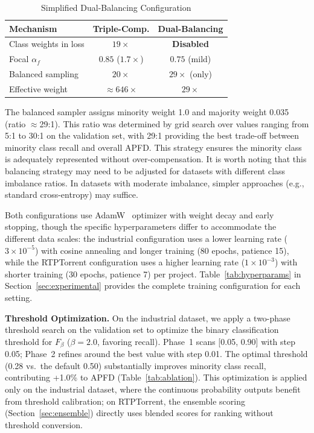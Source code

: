 \documentclass[10pt,journal,compsoc]{IEEEtran}
\begin{document}
\begin{table}[!t]
\centering
\caption{Simplified Dual-Balancing Configuration}
\label{tab:balancing}
\footnotesize
\begin{tabular}{lcc}
\toprule
\textbf{Mechanism} & \textbf{Triple-Comp.} & \textbf{Dual-Balancing} \\
\midrule
Class weights in loss & $19\times$ & \textbf{Disabled} \\
Focal $\alpha_f$ & $0.85$ ($1.7\times$) & $0.75$ (mild) \\
Balanced sampling & $20\times$ & $29\times$ (only) \\
\midrule
Effective weight & $\approx 646\times$ & $29\times$ \\
\bottomrule
\end{tabular}
\end{table}

The balanced sampler assigns minority weight 1.0 and majority weight 0.035
(ratio $\approx$29:1). This ratio was determined by grid search over values
ranging from 5:1 to 30:1 on the validation set, with 29:1 providing the best
trade-off between minority class recall and overall APFD. This strategy
ensures the minority class is adequately represented without over-compensation.
It is worth noting that this balancing strategy may need to be adjusted for
datasets with different class imbalance ratios. In datasets with moderate
imbalance, simpler approaches (e.g., standard cross-entropy) may suffice.

Both configurations use AdamW~\cite{loshchilov2019adamw} optimizer with
weight decay and early stopping, though the specific hyperparameters differ
to accommodate the different data scales: the industrial configuration uses a
lower learning rate ($3 \times 10^{-5}$) with cosine annealing and longer
training (80 epochs, patience 15), while the RTPTorrent configuration uses a
higher learning rate ($1 \times 10^{-3}$) with shorter training (30 epochs,
patience 7) per project. Table~\ref{tab:hyperparams} in
Section~\ref{sec:experimental} provides the complete training configuration
for each setting.

\textbf{Threshold Optimization.}
On the industrial dataset, we apply a two-phase threshold search on the
validation set to optimize the binary classification threshold for
$F_{\beta}$ ($\beta = 2.0$, favoring recall). Phase~1 scans [0.05, 0.90]
with step 0.05; Phase~2 refines around the best value with step 0.01.
The optimal threshold (0.28 vs.\ the default 0.50) substantially improves
minority class recall, contributing +1.0\% to APFD
(Table~\ref{tab:ablation}). This optimization is applied only on the
industrial dataset, where the continuous probability outputs benefit from
threshold calibration; on RTPTorrent, the ensemble scoring
(Section~\ref{sec:ensemble}) directly uses blended scores for ranking
without threshold conversion.
\end{document}
